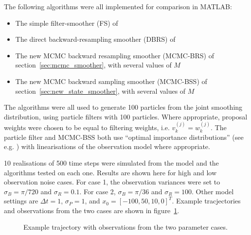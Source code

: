 \documentclass[journal]{IEEEtran}
\begin{document}
The following algorithms were all implemented for comparison in MATLAB:

\begin{itemize}
	\item The simple filter-smoother (FS) of \cite{Kitagawa1996}
	\item The direct backward-resampling smoother (DBRS) of \cite{Godsill2004}
	\item The new MCMC backward resampling smoother (MCMC-BRS) of section~\ref{sec:mcmc_smoother}, with several values of $M$
	\item The new MCMC backward sampling smoother (MCMC-BSS) of section~\ref{sec:new_state_smoother}, with several values of $M$
\end{itemize}

The algorithms were all used to generate 100 particles from the joint smoothing distribution, using particle filters with 100 particles. Where appropriate, proposal weights were chosen to be equal to filtering weights, i.e. $v_k^{(j)} = w_k^{(j)}$. The particle filter and MCMC-BSS both use ``optimal importance distributions'' (see e.g. \cite{Cappe2007}) with linearisations of the observation model where appropriate.

10 realisations of 500 time steps were simulated from the model and the algorithms tested on each one. Results are shown here for high and low observation noise cases. For case 1, the observation variances were set to $\sigma_B = \pi/720$ and $\sigma_R = 0.1$. For case 2, $\sigma_B = \pi/36$ and $\sigma_R = 100$. Other model settings are $\Delta t = 1$, $\sigma_P = 1$, and $x_0 = [-100, 50, 10, 0]^T$. Example tracjectories and observations from the two cases are shown in figure~\ref{fig:example_trajectories}.

\begin{figure}
\centerline{
\hfil
{}}
\caption{Example trajectory with observations from the two parameter cases.}
\label{fig:example_trajectories}
\end{figure}
\end{document}
